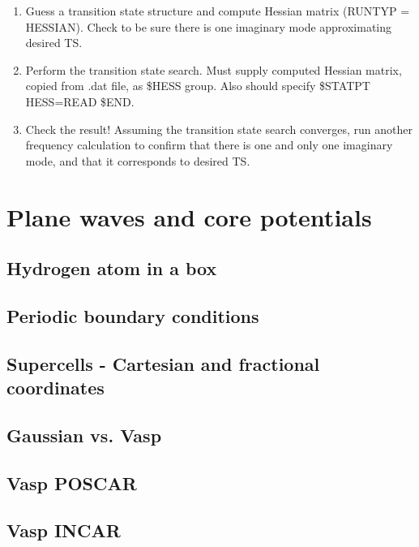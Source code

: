 \documentclass[11pt]{article}
\begin{document}
\begin{enumerate}
\item Guess a transition state structure and compute Hessian matrix (RUNTYP = HESSIAN).  Check to be sure there is one imaginary mode approximating desired TS.
\item Perform the transition state search.  Must supply computed Hessian matrix, copied from .dat file, as \$HESS group.  Also should specify \$STATPT HESS=READ \$END.
\item Check the result!  Assuming the transition state search converges, run another frequency calculation to confirm that there is one and only one imaginary mode, and that it corresponds to desired TS.
\end{enumerate}

\section{Plane waves and core potentials}
\label{sec:org16dc4a1}

\subsection{Hydrogen atom in a box}
\label{sec:orge0c1314}

\subsection{Periodic boundary conditions}
\label{sec:orga4010b9}

\subsection{Supercells - Cartesian and fractional coordinates}
\label{sec:orgaf441c9}

\subsection{Gaussian vs. Vasp}
\label{sec:org5501b46}

\subsection{Vasp POSCAR}
\label{sec:org07b744f}

\subsection{Vasp INCAR}
\label{sec:org0866f30}
\end{document}
